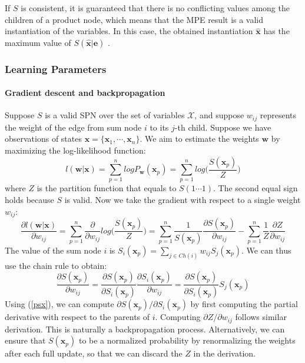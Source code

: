 \documentclass[10pt, titlepage]{article}
\theoremstyle{definition}
\newcommand\mb{\mathbf}
\begin{document}
If $S$ is consistent, it is guaranteed that there is no conflicting values among the children of a product node, which means that the MPE result is a valid instantiation of the variables. In this case, the obtained instantiation $\hat{\mb{x}}$ has the maximum value of $S(\hat{\mb{x}}|\mb{e})$ \cite{poon2011sum}.

\subsubsection{Learning Parameters}

\paragraph{Gradient descent and backpropagation} Suppose $S$ is a valid SPN over the set of variables $\mathcal{X}$, and suppose $w_{ij}$ represents the weight of the edge from sum node $i$ to its $j$-th child. Suppose we have observations of states $\mb{x}=\{\mb{x}_1,\cdots,\mb{x}_n\}$. We aim to estimate the weights $\mb{w}$ by maximizing the log-likelihood function:
\begin{equation}
l(\mb{w}|\mb{x})=\sum_{p=1}^{n}logP_{\mb{w}}(\mb{x}_p)=\sum_{p=1}^{n}log\Big(\frac{S(\mb{x}_p)}{Z}\Big)
\end{equation}
where $Z$ is the partition function that equals to $S(1\cdots1)$. The second equal sign holds because $S$ is valid. Now we take the gradient with respect to a single weight $w_{ij}$:
\begin{equation}
\label{dl}
\frac{\partial l(\mb{w}|\mb{x})}{\partial w_{ij}}=\sum_{p=1}^{n}\frac{\partial}{\partial w_{ij}}log\Big(\frac{S(\mb{x}_p)}{Z}\Big)=\sum_{p=1}^{n}\frac{1}{S(\mb{x}_p)}\frac{\partial S(\mb{x}_p)}{\partial w_{ij}}-\sum_{p=1}^{n}\frac{1}{Z}\frac{\partial Z}{\partial w_{ij}}
\end{equation}
The value of the sum node $i$ is $S_i(\mb{x}_p)=\sum_{j\in Ch(i)}w_{ij}S_j(\mb{x}_p)$. We can thus use the chain rule to obtain:
\begin{equation}
\frac{\partial S(\mb{x}_p)}{\partial w_{ij}} = \frac{\partial S(\mb{x}_p)}{\partial S_i(\mb{x}_p)}\frac{\partial S_i(\mb{x}_p)}{\partial w_{ij}}=\frac{\partial S(\mb{x}_p)}{\partial S_i(\mb{x}_p)}S_j(\mb{x}_p)
\end{equation}
Using (\ref{psx}), we can compute $\partial S(\mb{x}_p)/\partial S_i(\mb{x}_p)$ by first computing the partial derivative with respect to the parents of $i$. Computing $\partial Z/\partial w_{ij}$ follows similar derivation. This is naturally a backpropagation process. Alternatively, we can ensure that $S(\mb{x}_p)$ to be a normalized probability by renormalizing the weights after each full update, so that we can discard the $Z$ in the derivation.
\end{document}
